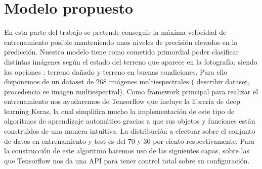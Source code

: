 \section{Modelo propuesto}\label{sec:modelo-propuesto}
En esta parte del trabajo se pretende conseguir la máxima velocidad de entrenamiento posible manteniendo unos niveles de precisión elevados en la predicción.
Nuestro modelo tiene como cometido primordial poder clasificar distintas imágenes según el estado del terreno que aparece en la fotografía, siendo las opciones : terreno dañado y
terreno en buenas condiciones.
Para ello disponemos de un dataset de 268 imágenes multiespectrales ( describir dataset, procedencia ee imagen multiespectral).
Como framework principal para realizar el entrenamiento nos ayudaremos de Tensorflow que incluye la librería de deep learning Keras, la cual simplifica mucho la implementación de este tipo de algoritmos de
aprendizaje automático gracias a que sus objetos y funciones están construidos de una manera intuitiva.
La distribución a efectuar sobre el conjunto de datos en entrenamiento y test es del 70 y 30 por ciento respectivamente.
Para la construcción de este algoritmo haremos uso de las siguientes capas, sobre las que Tensorflow nos da una API para tener control total sobre su configuración.

